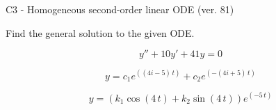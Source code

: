 \begin{exercise}
  \begin{exerciseTitle}C3 - Homogeneous second-order linear ODE (ver. 81)\end{exerciseTitle}
  \begin{exerciseStatement}
    
Find the general solution to the given ODE.

    
\[y''+10y'+41y = 0\]

  \end{exerciseStatement}
  \begin{exerciseAnswer}
    
\[y= c_{1} e^{\left(\left(4 i - 5\right) \, t\right)} + c_{2} e^{\left(-\left(4 i + 5\right) \, t\right)}\]

    
\[y= {\left(k_{1} \cos\left(4 \, t\right) + k_{2} \sin\left(4 \, t\right)\right)} e^{\left(-5 \, t\right)}\]

  \end{exerciseAnswer}
\end{exercise}